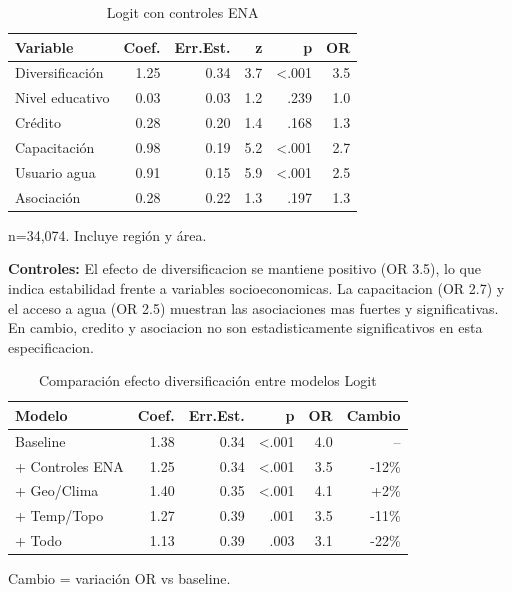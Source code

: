 \documentclass[10pt,a4paper]{article}
\begin{document}
\begin{table}[H]
\centering
\caption{Logit con controles ENA}
\label{tab:logit_controls}
\begin{threeparttable}
\small
\begin{tabular}{lrrrrr}
\toprule
\textbf{Variable} & \textbf{Coef.} & \textbf{Err.Est.} & \textbf{z} & \textbf{p} & \textbf{OR} \\
\midrule
Diversificación & 1.25 & 0.34 & 3.7 & <.001 & 3.5 \\
Nivel educativo & 0.03 & 0.03 & 1.2 & .239 & 1.0 \\
Crédito & 0.28 & 0.20 & 1.4 & .168 & 1.3 \\
Capacitación & 0.98 & 0.19 & 5.2 & <.001 & 2.7 \\
Usuario agua & 0.91 & 0.15 & 5.9 & <.001 & 2.5 \\
Asociación & 0.28 & 0.22 & 1.3 & .197 & 1.3 \\
\bottomrule
\end{tabular}
\begin{tablenotes}
\footnotesize
\item n=34,074. Incluye región y área.
\end{tablenotes}
\end{threeparttable}
\end{table}

\textbf{Controles:} El efecto de diversificacion se mantiene positivo (OR 3.5), lo que indica estabilidad frente a variables socioeconomicas. La capacitacion (OR 2.7) y el acceso a agua (OR 2.5) muestran las asociaciones mas fuertes y significativas. En cambio, credito y asociacion no son estadisticamente significativos en esta especificacion.

\begin{table}[H]
\centering
\caption{Comparación efecto diversificación entre modelos Logit}
\label{tab:logit_compare_all}
\begin{threeparttable}
\small
\begin{tabular}{lrrrrr}
\toprule
\textbf{Modelo} & \textbf{Coef.} & \textbf{Err.Est.} & \textbf{p} & \textbf{OR} & \textbf{Cambio} \\
\midrule
Baseline & 1.38 & 0.34 & <.001 & 4.0 & -- \\
+ Controles ENA & 1.25 & 0.34 & <.001 & 3.5 & -12\% \\
+ Geo/Clima & 1.40 & 0.35 & <.001 & 4.1 & +2\% \\
+ Temp/Topo & 1.27 & 0.39 & .001 & 3.5 & -11\% \\
+ Todo & 1.13 & 0.39 & .003 & 3.1 & -22\% \\
\bottomrule
\end{tabular}
\begin{tablenotes}
\footnotesize
\item Cambio = variación OR vs baseline.
\end{tablenotes}
\end{threeparttable}
\end{table}
\end{document}

